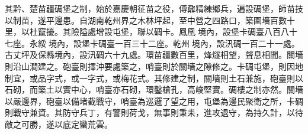 \begin{pinyinscope}
其黔、楚苗疆碉堡之制，始於嘉慶朝征苗之役，傅鼐精練鄉兵，遍設碉堡，師苗技以制苗，遂平邊患。自湖南乾州界之木林坪起，至中營之四路口，築圍墻百數十里，以杜竄擾。其險隘處增設屯堡，聯以碉卡。鳳凰境內，設堡卡碉臺八百八十七座。永綏境內，設堡卡碉臺一百三十二座。乾州境內，設汛碉一百二十一處。古丈坪及保縣境內，設汛碉六十九處。環苗疆數百里，烽燧相望，聲息相聞。關墻則沿山澗建之。砲臺則擇沖要處築之，哨臺則於關墻之隙修之。卡碉屯堡，則因地制宜，或品字式，或一字式，或梅花式。其修建之制，關墻則土石兼施，砲臺則以石砌，而築土以實中心，哨臺亦石砌，環鑿槍孔，高峻堅實。碉樓之制亦然。關墻以嚴邊界，砲臺以備堵截戰守，哨臺為巡邏了望之用，屯堡為邊民聚衛之所，卡碉則戰守兼資。其防守兵丁，有警則荷戈，無事則秉耒，進攻退守，為持久計，以待敵之可勝，遂以底定蠻荒雲。


\end{pinyinscope}